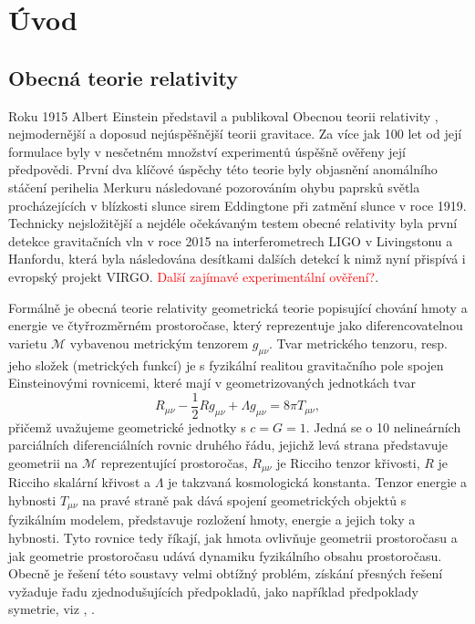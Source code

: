 \chapter*{Úvod}

\section*{Obecná teorie relativity}

Roku 1915 Albert Einstein představil a publikoval Obecnou teorii relativity \cite{Einstein1915}, nejmodernější a doposud nejúspěšnější teorii gravitace. Za více jak 100 let od její formulace byly v nesčetném množství
experimentů úspěšně ověřeny její předpovědi. První dva klíčové úspěchy této teorie byly objasnění anomálního stáčení perihelia Merkuru následované pozorováním ohybu paprsků světla procházejících v blízkosti slunce
sirem Eddingtone při zatmění slunce v roce 1919.
Technicky nejsložitější a nejdéle očekávaným testem obecné relativity byla první detekce gravitačních vln v roce 2015 na interferometrech LIGO v Livingstonu a Hanfordu, která byla následována
desítkami dalších detekcí k nimž nyní přispívá i evropský projekt VIRGO. \textcolor{red}{Další zajímavé experimentální ověření?}.


Formálně je obecná teorie relativity geometrická teorie popisující chování hmoty a energie ve čtyřrozměrném prostoročase, který reprezentuje jako diferencovatelnou varietu $\mathcal{M}$ vybavenou metrickým tenzorem $g_{\mu \nu}$.
Tvar metrického tenzoru, resp. jeho složek (metrických funkcí) je s fyzikální realitou gravitačního pole spojen Einsteinovými rovnicemi, které mají v geometrizovaných jednotkách
tvar
\begin{equation}
    \label{eq:einsten_field_equations}
    R_{\mu \nu} - \frac{1}{2} R g_{\mu \nu} + \Lambda g_{\mu \nu} = 8 \pi T_{\mu \nu},
\end{equation}
přičemž uvažujeme geometrické jednotky s $c = G = 1$.
Jedná se o 10 nelineárních parciálních diferenciálních rovnic druhého řádu, jejichž levá strana představuje geometrii na $\mathcal{M}$ reprezentující prostoročas, $R_{\mu \nu}$ je Ricciho tenzor křivosti, $R$ je Ricciho skalární křivost a $\Lambda$
je takzvaná kosmologická konstanta. Tenzor energie a hybnosti $T_{\mu \nu}$ na pravé straně pak dává spojení geometrických objektů s fyzikálním modelem, představuje rozložení hmoty,
energie a jejich toky a hybnosti. Tyto rovnice tedy říkají, jak hmota ovlivňuje geometrii prostoročasu a jak geometrie prostoročasu udává dynamiku fyzikálního obsahu prostoročasu.
Obecně je řešení této soustavy velmi obtížný problém, získání přesných řešení vyžaduje řadu zjednodušujících předpokladů, jako například
předpoklady symetrie, viz \cite{griffiths_podolsky_2009}, \cite{stephani2003}.


